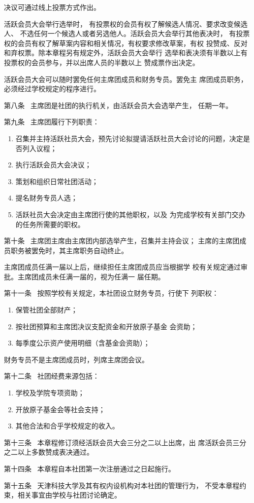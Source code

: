 \documentclass{gbt9704}
\begin{document}
决议可通过线上投票方式作出。

活跃会员大会举行选举时，
有投票权的会员有权了解候选人情况、要求改变候选人、
不选任何一个候选人或者另选他人。活跃会员大会举行其他表决时，
有投票权的会员有权了解草案内容和相关情况，有权要求修改草案，有权
投赞成、反对和弃权票。除本章程另有规定外，活跃会员大会举行
选举和表决须有半数以上有投票权的会员参与，并以出席人员的半数以上
赞成票作出决定。


活跃会员大会可以随时罢免任何主席团成员和财务专员。罢免主
席团成员职务，必须经过学校规定的程序进行。


第八条~ 主席团是社团的执行机关，由活跃会员大会选举产生，
任期一年。


第九条~ 主席团履行下列职责：
\begin{enumerate}
    \item 召集并主持活跃社员大会，预先讨论拟提请活跃社员大会讨论的问题，决定是否列入议程；
    \item 执行活跃会员大会决议；
    \item 策划和组织日常社团活动；
    \item 提名财务专员人选；
    \item 活跃社员大会决定由主席团行使的其他职权，以及
    为完成学校有关部门交办的任务所需要的职权。
\end{enumerate}


第十条~ 主席团主席由主席团内部选举产生，召集并主持会议；
主席的主席团成员职务被罢免时，其主席职务自动终止。

主席团成员任满一届以上后，继续担任主席团成员应当根据学
校有关规定通过审批。主席团成员未任满一届的，视为任满一
届任期。

第十一条~ 按照学校有关规定，本社团设立财务专员，行使下
列职权：
\begin{enumerate}
    \item 保管社团全部财产；
    \item 按社团预算和主席团决议支配资金和开放原子基金
    会资助；
    \item 每季度公示资产使用明细（含基金会资助）；
\end{enumerate}


财务专员不是主席团成员时，列席主席团会议。


第十二条~ 社团经费来源包括：
\begin{enumerate}
    \item 学校及学院专项资助；
    \item 开放原子基金会等社会支持；
    \item 其他合法和合乎学校规定的收入。
\end{enumerate}


第十三条~ 本章程修订须经活跃会员大会三分之二以上出席，出
席活跃会员三分之二以上多数赞成表决通过。


第十四条~ 本章程自本社团第一次注册通过之日起施行。

第十五条~ 天津科技大学及其有权内设机构对本社团的管理行为，
不受本章程约束，相关事宜由学校与社团讨论确定。
\end{document}
